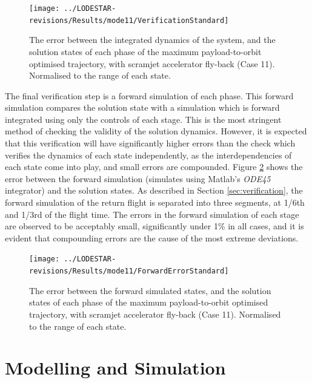 \begin{figure}[ht]
	\centering
	\texttt{[image: ../LODESTAR-revisions/Results/mode11/VerificationStandard]}
	\caption{The error between the integrated dynamics of the system, and the solution states of each phase of the maximum payload-to-orbit optimised trajectory, with scramjet accelerator fly-back (Case 11). Normalised to the range of each state.}
	\label{fig:VerificationStandard}
\end{figure}

The final verification step is a forward simulation of each phase. This forward simulation compares the solution state with a simulation which is forward integrated using only the controls of each stage. This is the most stringent method of checking the validity of the solution dynamics. However, it is expected that this verification will have significantly higher errors than the check which verifies the dynamics of each state independently, as the interdependencies of each state come into play, and small errors are compounded. Figure \ref{fig:ForwardErrorStandard} shows the error between the forward simulation (simulates using Matlab's \textit{ODE45} integrator) and the solution states. As described in Section \ref{sec:verification}, the forward simulation of the return flight is separated into three segments, at 1/6th and 1/3rd of the flight time. The errors in the forward simulation of each stage are observed to be acceptably small, significantly under 1\% in all cases, and it is evident that compounding errors are the cause of the most extreme deviations. 

\begin{figure}[ht]
	\centering
	\texttt{[image: ../LODESTAR-revisions/Results/mode11/ForwardErrorStandard]}
	\caption{The error between the forward simulated states, and the solution states of each phase of the maximum payload-to-orbit optimised trajectory, with scramjet accelerator fly-back (Case 11). Normalised to the range of each state.}
	\label{fig:ForwardErrorStandard}
\end{figure}



\chapter{Modelling and Simulation}\label{Appendix:sim}
